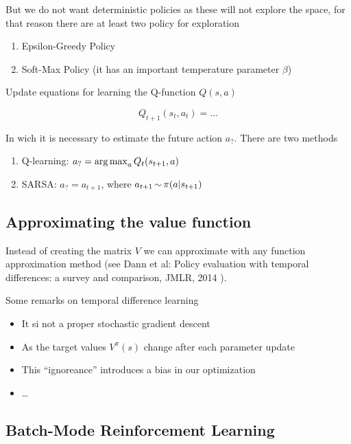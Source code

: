 \documentclass[b5paper]{report}
\begin{document}
But we do not want deterministic policies as these will not explore the space,
for that reason there are at least two policy for exploration

\begin{enumerate}
  \item Epsilon-Greedy Policy
  \item Soft-Max Policy (it has an important temperature parameter $\beta$)
\end{enumerate}

Update equations for learning the Q-function $Q(s,a)$

\begin{equation}
  Q_{t+1}(s_t,a_t) =  \dots
\end{equation}

In wich it is necessary to estimate the future action $a_?$. There are two
methods

\begin{enumerate}
  \item Q-learning: $a_? = \operatorname*{arg\,max}_a Q_t(s_{t+1}, a)$
  \item SARSA: $a_? = a_{t+1}$, where $a_{t+1} \operatorname*{\sim} \pi(a|s_{t+1})$
\end{enumerate}

\subsection{Approximating the value function}

Instead of creating the matrix $V$ we can approximate with any function
approximation method (see Dann et al: Policy evaluation with temporal
differences: a survey and comparison, JMLR, 2014 \cite{dann2014policy}).

Some remarks on temporal difference learning

\begin{itemize}
  \item It si not a proper stochastic gradient descent
  \item As the target values $V^\pi(s)$ change after each parameter update
  \item This ``ignoreance'' introduces a bias in our optimization 
  \item \dots
\end{itemize}

\subsection{Batch-Mode Reinforcement Learning}
\end{document}
